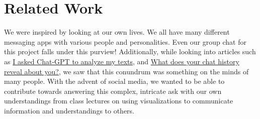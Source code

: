 \documentclass{article}\usepackage{graphicx}
\begin{document}
\section{Related Work}
We were inspired by looking at our own lives. We all have many different messaging apps with various people and personalities. Even our group chat for this project falls under this purview! Additionally, while looking into articles such as \href{https://www.businessinsider.com/chatgpt-analyze-chat-history-between-girlfriend-boyfriend-2025-3}{I asked Chat-GPT to analyze my texts}, and \href{https://www.youtube.com/watch?v=PROIhoYPaXM}{What does your chat history reveal about you?}, we saw that this conundrum was something on the minds of many people. With the advent of social media, we wanted to be able to contribute towards answering this complex, intricate ask with our own understandings from class lectures on using visualizations to communicate information and understandings to others.
\end{document}
